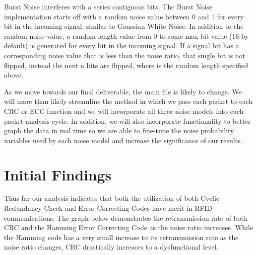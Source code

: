 \documentclass{sigcomm-alternate}
\begin{document}
Burst Noise interferes with a series contiguous bits. The Burst Noise implementation starts off with a random noise value between 0 and 1 for every bit in the incoming signal, similar to Gaussian White Noise. In addition to the random noise value, a random length value from 0 to some max bit value (16 by default) is generated for every bit in the incoming signal. If a signal bit has a corresponding noise value that is less than the noise ratio, that single bit is not flipped, instead the next n bits are flipped, where is the random length specified above.

As we move towards our final deliverable, the main file is likely to change. We will more than likely streamline the method in which we pass each packet to each CRC or ECC function and we will incorporate all three noise models into each packet analysis cycle. In addition, we will also incorporate functionality to better graph the data in real time so we are able to fine-tune the noise probability variables used by each noise model and increase the significance of our results.

\section{Initial Findings}
Thus far our analysis indicates that both the utilization of both Cyclic Redundancy Check and Error Correcting Codes have merit in RFID communications. The graph below demonstrates the retransmission rate of both CRC and the Hamming Error Correcting Code as the noise ratio increases. While the Hamming code has a very small increase to its retransmission rate as the noise ratio changes, CRC drastically increases to a dysfunctional level.\\

 \\
\end{document}
